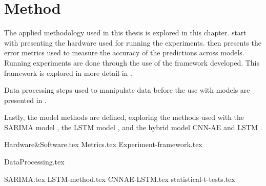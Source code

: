 \chapter{Method}
\label{section:Method}

The applied methodology used in this thesis is explored in this chapter.
 start with presenting the hardware used for running the experiments.
 then presents the error metrics used to measure the accuracy of the predictions across models.
Running experiments are done through the use of the framework developed. This framework is explored in more detail in .

Data processing steps used to manipulate data before the use with models are presented in .

Lastly, the model methods are defined, exploring the methods used with the SARIMA model , the LSTM model ,
and the hybrid model CNN-AE and LSTM .


{Hardware&Software.tex}
{Metrics.tex}
{Experiment-framework.tex}

{DataProcessing.tex}

{SARIMA.tex}
{LSTM-method.tex}
{CNNAE-LSTM.tex}
{statistical-t-tests.tex}
